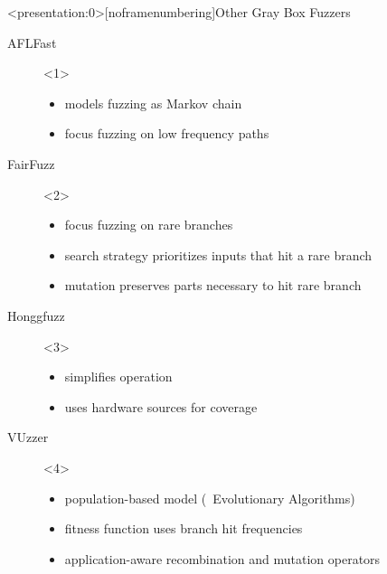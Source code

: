 \documentclass[\HandoutMode,table]{beamer}
\begin{document}
\begin{frame}<presentation:0>[noframenumbering]{Other Gray Box Fuzzers}
    \begin{description}
        \item[AFLFast]<1>
            \begin{itemize}
                \item{} models fuzzing as Markov chain
                \item{} focus fuzzing on low frequency paths
            \end{itemize}
        \item[FairFuzz]<2>
            \begin{itemize}
                \item{} focus fuzzing on rare branches
                \item{} search strategy prioritizes inputs that hit a rare branch
                \item{} mutation preserves parts necessary to hit rare branch
            \end{itemize}
        \item[Honggfuzz]<3>
            \begin{itemize}
                \item{} simplifies operation
                \item{} uses hardware sources for coverage
            \end{itemize}
        \item[VUzzer]<4>
            \begin{itemize}
                \item{} population-based model (\ie~Evolutionary Algorithms)
                \item{} fitness function uses branch hit frequencies
                \item{} application-aware recombination and mutation operators
            \end{itemize}
    \end{description}
\end{frame}
\end{document}
